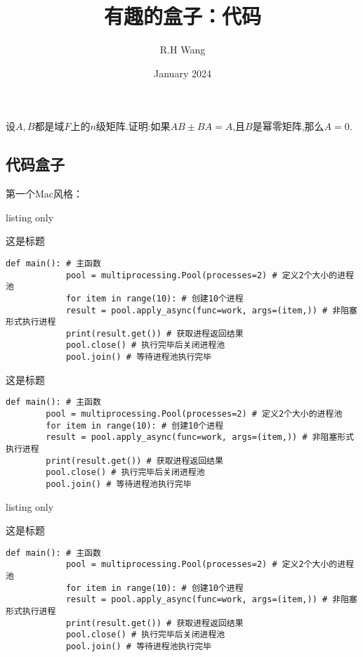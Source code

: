 \documentclass[a4]{ctexart}
\title{有趣的盒子：代码}
\author{R.H Wang}
\date{January 2024}
\begin{document}
\maketitle

\begin{tcblisting}{}
	\begin{mybox1}
		设$A,B$都是域$F$上的$n$级矩阵.证明:如果$AB\pm BA=A$,且$B$是幂零矩阵,那么$A=0$.
	\end{mybox1}
\end{tcblisting}

\subsection{代码盒子}
第一个Mac风格：
\begin{tcblisting}{listing only}
	\begin{macbox}{这是标题}
		\begin{lstlisting}[style=python4]
			def main(): # 主函数
			pool = multiprocessing.Pool(processes=2) # 定义2个大小的进程池
			for item in range(10): # 创建10个进程
			result = pool.apply_async(func=work, args=(item,)) # 非阻塞形式执行进程
			print(result.get()) # 获取进程返回结果
			pool.close() # 执行完毕后关闭进程池
			pool.join() # 等待进程池执行完毕
		\end{lstlisting}
	\end{macbox}
\end{tcblisting}


\begin{macbox}{这是标题}
	\begin{lstlisting}[style=python4]
		def main(): # 主函数
		pool = multiprocessing.Pool(processes=2) # 定义2个大小的进程池
		for item in range(10): # 创建10个进程
		result = pool.apply_async(func=work, args=(item,)) # 非阻塞形式执行进程
		print(result.get()) # 获取进程返回结果
		pool.close() # 执行完毕后关闭进程池
		pool.join() # 等待进程池执行完毕
	\end{lstlisting}
\end{macbox}

\begin{tcblisting}{listing only}
	\begin{macboxd}{这是标题}
		\begin{lstlisting}[style=python3]
			def main(): # 主函数
			pool = multiprocessing.Pool(processes=2) # 定义2个大小的进程池
			for item in range(10): # 创建10个进程
			result = pool.apply_async(func=work, args=(item,)) # 非阻塞形式执行进程
			print(result.get()) # 获取进程返回结果
			pool.close() # 执行完毕后关闭进程池
			pool.join() # 等待进程池执行完毕
		\end{lstlisting}
	\end{macboxd}
\end{tcblisting}
\end{document}
